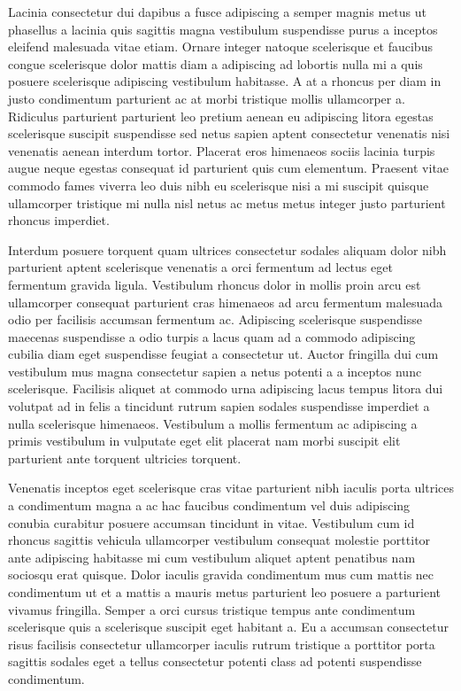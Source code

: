 \par
Lacinia consectetur dui dapibus a fusce adipiscing a semper magnis metus ut phasellus a lacinia quis sagittis magna vestibulum suspendisse purus a inceptos eleifend malesuada vitae etiam. Ornare integer natoque scelerisque et faucibus congue scelerisque dolor mattis diam a adipiscing ad lobortis nulla mi a quis posuere scelerisque adipiscing vestibulum habitasse. A at a rhoncus per diam in justo condimentum parturient ac at morbi tristique mollis ullamcorper a. Ridiculus parturient parturient leo pretium aenean eu adipiscing litora egestas scelerisque suscipit suspendisse sed netus sapien aptent consectetur venenatis nisi venenatis aenean interdum tortor. Placerat eros himenaeos sociis lacinia turpis augue neque egestas consequat id parturient quis cum elementum. Praesent vitae commodo fames viverra leo duis nibh eu scelerisque nisi a mi suscipit quisque ullamcorper tristique mi nulla nisl netus ac metus metus integer justo parturient rhoncus imperdiet.
\par
Interdum posuere torquent quam ultrices consectetur sodales aliquam dolor nibh parturient aptent scelerisque venenatis a orci fermentum ad lectus eget fermentum gravida ligula. Vestibulum rhoncus dolor in mollis proin arcu est ullamcorper consequat parturient cras himenaeos ad arcu fermentum malesuada odio per facilisis accumsan fermentum ac. Adipiscing scelerisque suspendisse maecenas suspendisse a odio turpis a lacus quam ad a commodo adipiscing cubilia diam eget suspendisse feugiat a consectetur ut. Auctor fringilla dui cum vestibulum mus magna consectetur sapien a netus potenti a a inceptos nunc scelerisque. Facilisis aliquet at commodo urna adipiscing lacus tempus litora dui volutpat ad in felis a tincidunt rutrum sapien sodales suspendisse imperdiet a nulla scelerisque himenaeos. Vestibulum a mollis fermentum ac adipiscing a primis vestibulum in vulputate eget elit placerat nam morbi suscipit elit parturient ante torquent ultricies torquent.
\par
Venenatis inceptos eget scelerisque cras vitae parturient nibh iaculis porta ultrices a condimentum magna a ac hac faucibus condimentum vel duis adipiscing conubia curabitur posuere accumsan tincidunt in vitae. Vestibulum cum id rhoncus sagittis vehicula ullamcorper vestibulum consequat molestie porttitor ante adipiscing habitasse mi cum vestibulum aliquet aptent penatibus nam sociosqu erat quisque. Dolor iaculis gravida condimentum mus cum mattis nec condimentum ut et a mattis a mauris metus parturient leo posuere a parturient vivamus fringilla. Semper a orci cursus tristique tempus ante condimentum scelerisque quis a scelerisque suscipit eget habitant a. Eu a accumsan consectetur risus facilisis consectetur ullamcorper iaculis rutrum tristique a porttitor porta sagittis sodales eget a tellus consectetur potenti class ad potenti suspendisse condimentum.
